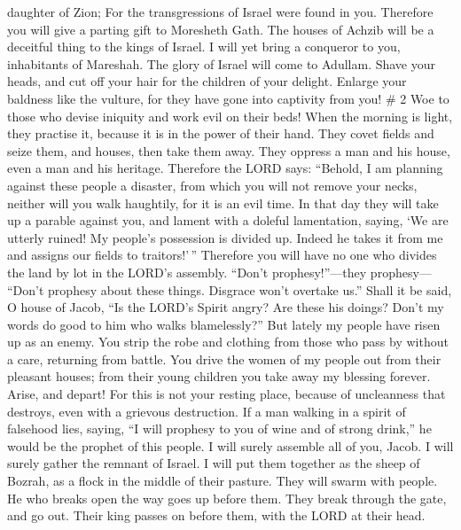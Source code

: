 daughter of Zion; For the transgressions of Israel were found in you.
 Therefore you will give a parting gift to Moresheth Gath.
The houses of Achzib will be a deceitful thing to the kings of Israel.
 I will yet bring a conqueror to you, inhabitants of
Mareshah. The glory of Israel will come to Adullam.  Shave
your heads, and cut off your hair for the children of your delight.
Enlarge your baldness like the vulture, for they have gone into
captivity from you! \# 2  Woe to those who devise iniquity
and work evil on their beds! When the morning is light, they practise
it, because it is in the power of their hand.  They covet
fields and seize them, and houses, then take them away. They oppress a
man and his house, even a man and his heritage.  Therefore
the LORD says: ``Behold, I am planning against these people a disaster,
from which you will not remove your necks, neither will you walk
haughtily, for it is an evil time.  In that day they will
take up a parable against you, and lament with a doleful lamentation,
saying, `We are utterly ruined! My people's possession is divided up.
Indeed he takes it from me and assigns our fields to traitors!'\,''
 Therefore you will have no one who divides the land by lot
in the LORD's assembly.  ``Don't prophesy!''---they
prophesy--- ``Don't prophesy about these things. Disgrace won't overtake
us.''  Shall it be said, O house of Jacob, ``Is the LORD's
Spirit angry? Are these his doings? Don't my words do good to him who
walks blamelessly?''  But lately my people have risen up as
an enemy. You strip the robe and clothing from those who pass by without
a care, returning from battle.  You drive the women of my
people out from their pleasant houses; from their young children you
take away my blessing forever.  Arise, and depart! For this
is not your resting place, because of uncleanness that destroys, even
with a grievous destruction.  If a man walking in a spirit
of falsehood lies, saying, ``I will prophesy to you of wine and of
strong drink,'' he would be the prophet of this people.  I
will surely assemble all of you, Jacob. I will surely gather the remnant
of Israel. I will put them together as the sheep of Bozrah, as a flock
in the middle of their pasture. They will swarm with people.
 He who breaks open the way goes up before them. They break
through the gate, and go out. Their king passes on before them, with the
LORD at their head.

